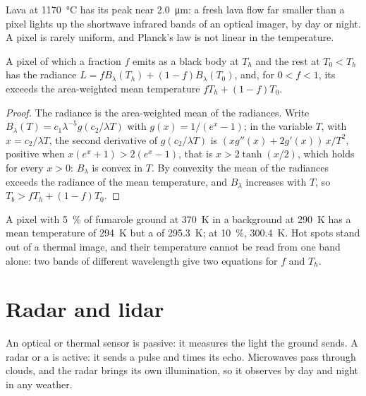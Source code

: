Lava at \qty{1170}{\celsius} has its peak near \qty{2.0}{\micro\metre}: a
fresh lava flow far smaller than a pixel lights up the shortwave infrared
bands of an optical imager, by day or night. A pixel is rarely uniform, and
Planck's law is not linear in the temperature.

\begin{proposition}\label{prop:b3:remote-sensing-gis:mixed}
A pixel of which a fraction $f$ emits as a black body at $T_h$ and the rest
at $T_0 < T_h$ has the radiance $L = fB_\lambda(T_h) + (1 - f)B_\lambda(T_0)$,
and, for $0 < f < 1$, its  exceeds the area-weighted
mean temperature $fT_h + (1 - f)T_0$.
\end{proposition}

\begin{proof}
The radiance is the area-weighted mean of the radiances. Write $B_\lambda(T)
= c_1\lambda^{-5}g(c_2/\lambda T)$ with $g(x) = 1/(e^x - 1)$; in the
variable $T$, with $x = c_2/\lambda T$, the second derivative of
$g(c_2/\lambda T)$ is $(x g''(x) + 2g'(x))\,x/T^2$, positive when $x(e^x + 1)
> 2(e^x - 1)$, that is $x > 2\tanh(x/2)$, which holds for every $x > 0$:
$B_\lambda$ is convex in $T$. By convexity
the mean of the radiances exceeds the radiance of the mean temperature, and
$B_\lambda$ increases with $T$, so $T_b > fT_h + (1 - f)T_0$.
\end{proof}

A pixel with \qty{5}{\percent} of
fumarole ground at \qty{370}{K} in a background at \qty{290}{K} has a mean
temperature of \qty{294}{K} but a  of \qty{295.3}{K};
at \qty{10}{\percent}, \qty{300.4}{K}. Hot spots stand out of a thermal
image, and their temperature cannot be read from one band alone: two bands
of different wavelength give two equations for $f$ and $T_h$.

\section{Radar and lidar}\label{sec:b3:remote-sensing-gis:radar}

An optical or thermal sensor is passive: it measures the light the ground
sends. A radar or a  is active: it sends a pulse and times its echo.
Microwaves pass through clouds, and the radar brings its own illumination,
so it observes by day and night in any weather.

